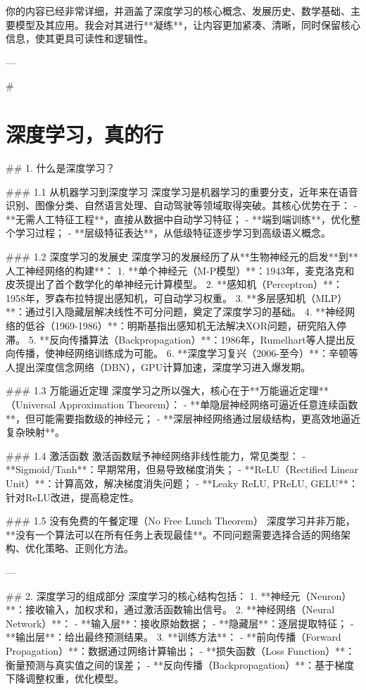 你的内容已经非常详细，并涵盖了深度学习的核心概念、发展历史、数学基础、主要模型及其应用。我会对其进行**凝练**，让内容更加紧凑、清晰，同时保留核心信息，使其更具可读性和逻辑性。

---

# \chapter{深度学习，真的行}

## 1. 什么是深度学习？

### 1.1  从机器学习到深度学习
深度学习是机器学习的重要分支，近年来在语音识别、图像分类、自然语言处理、自动驾驶等领域取得突破。其核心优势在于：
- **无需人工特征工程**，直接从数据中自动学习特征；
- **端到端训练**，优化整个学习过程；
- **层级特征表达**，从低级特征逐步学习到高级语义概念。

### 1.2 深度学习的发展史
深度学习的发展经历了从**生物神经元的启发**到**人工神经网络的构建**：
1. **单个神经元（M-P模型）**：1943年，麦克洛克和皮茨提出了首个数学化的单神经元计算模型。
2. **感知机（Perceptron）**：1958年，罗森布拉特提出感知机，可自动学习权重。
3. **多层感知机（MLP）**：通过引入隐藏层解决线性不可分问题，奠定了深度学习的基础。
4. **神经网络的低谷（1969-1986）**：明斯基指出感知机无法解决XOR问题，研究陷入停滞。
5. **反向传播算法（Backpropagation）**：1986年，Rumelhart等人提出反向传播，使神经网络训练成为可能。
6. **深度学习复兴（2006-至今）**：辛顿等人提出深度信念网络（DBN），GPU计算加速，深度学习进入爆发期。

### 1.3  万能逼近定理
深度学习之所以强大，核心在于**万能逼近定理**（Universal Approximation Theorem）：
- **单隐层神经网络可逼近任意连续函数**，但可能需要指数级的神经元；
- **深层神经网络通过层级结构，更高效地逼近复杂映射**。

### 1.4  激活函数
激活函数赋予神经网络非线性能力，常见类型：
- **Sigmoid/Tanh**：早期常用，但易导致梯度消失；
- **ReLU（Rectified Linear Unit）**：计算高效，解决梯度消失问题；
- **Leaky ReLU, PReLU, GELU**：针对ReLU改进，提高稳定性。

### 1.5  没有免费的午餐定理（No Free Lunch Theorem）
深度学习并非万能，**没有一个算法可以在所有任务上表现最佳**。不同问题需要选择合适的网络架构、优化策略、正则化方法。

---

## 2. 深度学习的组成部分
深度学习的核心结构包括：
1. **神经元（Neuron）**：接收输入，加权求和，通过激活函数输出信号。
2. **神经网络（Neural Network）**：
   - **输入层**：接收原始数据；
   - **隐藏层**：逐层提取特征；
   - **输出层**：给出最终预测结果。
3. **训练方法**：
   - **前向传播（Forward Propagation）**：数据通过网络计算输出；
   - **损失函数（Loss Function）**：衡量预测与真实值之间的误差；
   - **反向传播（Backpropagation）**：基于梯度下降调整权重，优化模型。

